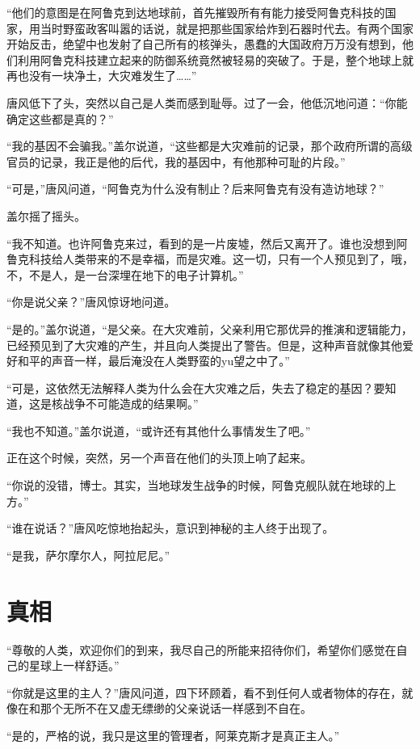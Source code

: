 “他们的意图是在阿鲁克到达地球前，首先摧毁所有有能力接受阿鲁克科技的国家，用当时野蛮政客叫嚣的话说，就是把那些国家给炸到石器时代去。有两个国家开始反击，绝望中也发射了自己所有的核弹头，愚蠢的大国政府万万没有想到，他们利用阿鲁克科技建立起来的防御系统竟然被轻易的突破了。于是，整个地球上就再也没有一块净土，大灾难发生了……”

唐风低下了头，突然以自己是人类而感到耻辱。过了一会，他低沉地问道：“你能确定这些都是真的？”

“我的基因不会骗我。”盖尔说道，“这些都是大灾难前的记录，那个政府所谓的高级官员的记录，我正是他的后代，我的基因中，有他那种可耻的片段。”

“可是，”唐风问道，“阿鲁克为什么没有制止？后来阿鲁克有没有造访地球？”

盖尔摇了摇头。

“我不知道。也许阿鲁克来过，看到的是一片废墟，然后又离开了。谁也没想到阿鲁克科技给人类带来的不是幸福，而是灾难。这一切，只有一个人预见到了，哦，不，不是人，是一台深埋在地下的电子计算机。”

“你是说父亲？”唐风惊讶地问道。

“是的。”盖尔说道，“是父亲。在大灾难前，父亲利用它那优异的推演和逻辑能力，已经预见到了大灾难的产生，并且向人类提出了警告。但是，这种声音就像其他爱好和平的声音一样，最后淹没在人类野蛮的yu望之中了。”

“可是，这依然无法解释人类为什么会在大灾难之后，失去了稳定的基因？要知道，这是核战争不可能造成的结果啊。”

“我也不知道。”盖尔说道，“或许还有其他什么事情发生了吧。”

正在这个时候，突然，另一个声音在他们的头顶上响了起来。

“你说的没错，博士。其实，当地球发生战争的时候，阿鲁克舰队就在地球的上方。”

“谁在说话？”唐风吃惊地抬起头，意识到神秘的主人终于出现了。

“是我，萨尔摩尔人，阿拉尼尼。”

\chapter{真相}

“尊敬的人类，欢迎你们的到来，我尽自己的所能来招待你们，希望你们感觉在自己的星球上一样舒适。”

“你就是这里的主人？”唐风问道，四下环顾着，看不到任何人或者物体的存在，就像在和那个无所不在又虚无缥缈的父亲说话一样感到不自在。

“是的，严格的说，我只是这里的管理者，阿莱克斯才是真正主人。”

